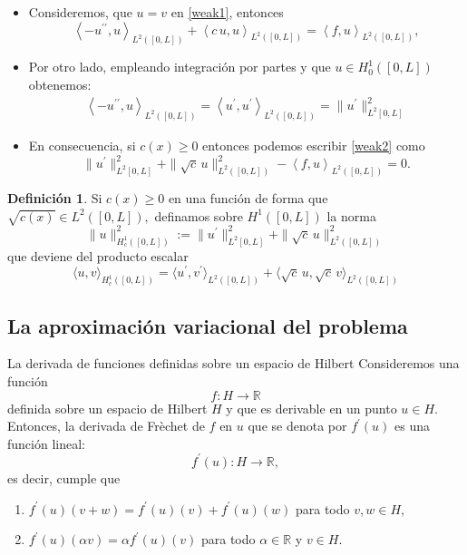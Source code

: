 \documentclass[10pt,handout]{beamer}
\theoremstyle{plain} %
\theoremstyle{plain} %
\theoremstyle{plain} %
\theoremstyle{plain} %
\theoremstyle{definition}
\newtheorem{defn}{Definici\'on}
\theoremstyle{example}
\theoremstyle{example}
\theoremstyle{remark}
\theoremstyle{remark}
\begin{document}
\begin{frame}
\begin{itemize}
\item Consideremos, que $u=v$ en \eqref{weak1}, entonces
\begin{equation}
\left\langle  - u^{\prime \prime} , u \right\rangle_{L^2([0,L])}  + \left\langle  c\,u, u \right\rangle_{L^2([0,L])}=  \left\langle f, u \right\rangle_{L^2([0,L])}, \label{weak2}
\end{equation}
\item Por otro lado, empleando integración por partes y que $u \in H_0^1([0,L])$ obtenemos:
\begin{align*}
\left\langle  - u^{\prime \prime} , u \right\rangle_{L^2([0,L])} = \left\langle  u^{\prime} ,  u^{\prime} \right\rangle_{L^2([0,L])} = \|u^{\prime}\|_{L^2[0,L]}^2
\end{align*}
\item En consecuencia, si $c(x) \ge 0$ entonces podemos escribir \eqref{weak2} como
\begin{equation}
\|u^{\prime}\|_{L^2[0,L]}^2 + \|\sqrt{c}\,u\|_{L^2([0,L])}^2 - \left\langle f, u \right\rangle_{L^2([0,L])} =0. \label{weak3}
\end{equation}
\end{itemize}
\end{frame}

\begin{frame}
\begin{defn}
Si $c(x) \ge 0$ en una función de forma que $\sqrt{c(x)} \in L^2([0,L]),$ definamos sobre $H^1([0,L])$ la norma
$$
\|u\|_{H^1_c([0,L])}^2 := \|u^{\prime}\|_{L^2[0,L]}^2 + \|\sqrt{c}\,u\|_{L^2([0,L])}^2
$$ 
que deviene del producto escalar
$$
\langle u,v \rangle_{H^1_c([0,L])} = \langle u^{\prime},v^{\prime} \rangle_{L^2([0,L])}
+ \langle  \sqrt{c}\,u,\sqrt{c}\,v \rangle_{L^2([0,L])}
$$
\end{defn}
\end{frame}

\subsection{La aproximación variacional del problema}

\begin{frame}{La derivada de funciones definidas sobre un espacio de Hilbert}
Consideremos una función $$f:H \longrightarrow \mathbb{R}$$ definida sobre un espacio de Hilbert $H$ y que es derivable en un punto $u \in H.$ Entonces, la derivada de Frèchet de $f$ en $u$ que se denota por $f^{\prime}(u)$  es una función lineal:
$$
f^{\prime}(u):H \longrightarrow \mathbb{R},
$$
es decir, cumple que
\begin{enumerate}
    \item $f^{\prime}(u)(v+w) = f^{\prime}(u)(v) + f^{\prime}(u)(w)$ para todo $v,w \in H,$
    \item $f^{\prime}(u)(\alpha v) = \alpha f^{\prime}(u)(v)$ para todo $\alpha \in \mathbb{R}$ y $v \in H.$
\end{enumerate}
\end{frame}
\end{document}
